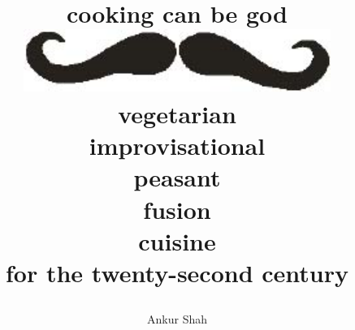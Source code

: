 
\title{\textbf{
  \Huge{cooking can be god}\\
  \bigskip
  \bigskip
  \includegraphics[width=10cm]{bigode.jpg}\\ 
  \bigskip
  \bigskip
  \bigskip
  \bigskip
  \bigskip        
  \bigskip
  \bigskip
  \bigskip        
  \Large{vegetarian\\
  improvisational\\
  peasant\\
  fusion\\
  cuisine\\
  for the twenty-second century}}
\bigskip
\bigskip     
\bigskip
\bigskip     
\bigskip
\bigskip     
\bigskip     
\bigskip
\bigskip
\bigskip
\date{}
\author{Ankur Shah}}
